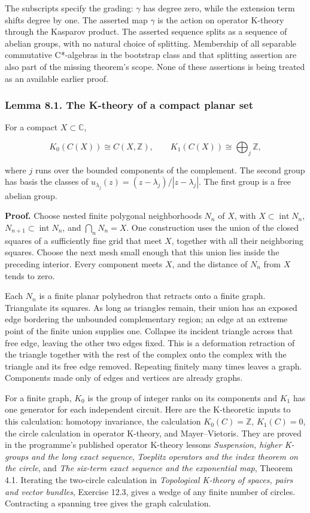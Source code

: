 \documentclass[
  11pt,
]{article}
\begin{document}
The subscripts specify the grading: \(\gamma\) has degree zero, while
the extension term shifts degree by one. The asserted map \(\gamma\) is
the action on operator K-theory through the Kasparov product. The
asserted sequence splits as a sequence of abelian groups, with no
natural choice of splitting. Membership of all separable commutative
C*-algebras in the bootstrap class and that splitting assertion are also
part of the missing theorem's scope. None of these assertions is being
treated as an available earlier proof.

\subsubsection{Lemma 8.1. The K-theory of a compact planar
set}\label{lemma-8.1.-the-k-theory-of-a-compact-planar-set}

For a compact \(X\subset\mathbb C\),

\[
K_0(C(X))\cong C(X,\mathbb Z),\qquad
K_1(C(X))\cong\bigoplus_j\mathbb Z,
\]

where \(j\) runs over the bounded components of the complement. The
second group has basis the classes of
\(u_{\lambda_j}(z)=(z-\lambda_j)/|z-\lambda_j|\). The first group is a
free abelian group.

\textbf{Proof.} Choose nested finite polygonal neighborhoods \(N_n\) of
\(X\), with \(X\subset\operatorname{int}N_n\),
\(N_{n+1}\subset\operatorname{int}N_n\), and \(\bigcap_nN_n=X\). One
construction uses the union of the closed squares of a sufficiently fine
grid that meet \(X\), together with all their neighboring squares.
Choose the next mesh small enough that this union lies inside the
preceding interior. Every component meets \(X\), and the distance of
\(N_n\) from \(X\) tends to zero.

Each \(N_n\) is a finite planar polyhedron that retracts onto a finite
graph. Triangulate its squares. As long as triangles remain, their union
has an exposed edge bordering the unbounded complementary region; an
edge at an extreme point of the finite union supplies one. Collapse its
incident triangle across that free edge, leaving the other two edges
fixed. This is a deformation retraction of the triangle together with
the rest of the complex onto the complex with the triangle and its free
edge removed. Repeating finitely many times leaves a graph. Components
made only of edges and vertices are already graphs.

For a finite graph, \(K_0\) is the group of integer ranks on its
components and \(K_1\) has one generator for each independent circuit.
Here are the K-theoretic inputs to this calculation: homotopy
invariance, the calculation \(K_0(C)=\mathbb Z\), \(K_1(C)=0\), the
circle calculation in operator K-theory, and Mayer--Vietoris. They are
proved in the programme's published operator K-theory lessons
\emph{Suspension, higher K-groups and the long exact sequence},
\emph{Toeplitz operators and the index theorem on the circle}, and
\emph{The six-term exact sequence and the exponential map}, Theorem 4.1.
Iterating the two-circle calculation in \emph{Topological K-theory of
spaces, pairs and vector bundles}, Exercise 12.3, gives a wedge of any
finite number of circles. Contracting a spanning tree gives the graph
calculation.
\end{document}

